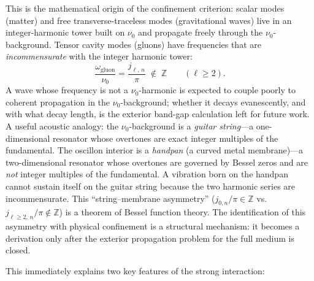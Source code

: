 \documentclass[11pt]{article}
\begin{document}
This is the mathematical origin of the
confinement criterion:
scalar modes (matter) and free transverse-traceless
modes (gravitational waves) live in an
integer-harmonic tower built on $\nu_0$ and
propagate freely through the $\nu_0$-background.
Tensor cavity modes (gluons) have frequencies
that are \emph{incommensurate} with the integer
harmonic tower:
\begin{equation}
  \boxed{
  \frac{\omega_{\mathrm{gluon}}}{\nu_0}
  = \frac{j_{\ell,\,n}}{\pi}
  \;\notin\; \mathbb{Z}
  \qquad (\ell \geq 2).
  }
  \label{eq:confinement_criterion}
\end{equation}
A wave whose frequency is not a $\nu_0$-harmonic
is expected to couple poorly to coherent
propagation in the $\nu_0$-background; whether it
decays evanescently, and with what decay length,
is the exterior band-gap calculation left for
future work.
A useful acoustic analogy: the $\nu_0$-background
is a \emph{guitar string}---a one-dimensional
resonator whose overtones are exact integer
multiples of the fundamental.  The oscillon
interior is a \emph{handpan} (a curved metal
membrane)---a two-dimensional resonator whose
overtones are governed by Bessel zeros and are
\emph{not} integer multiples of the fundamental.
A vibration born on the handpan cannot sustain
itself on the guitar string because the two
harmonic series are incommensurate.  This
``string--membrane asymmetry''
($j_{0,n}/\pi \in \mathbb{Z}$ vs.\
$j_{\ell \geq 2,\,n}/\pi \notin \mathbb{Z}$)
is a theorem of Bessel function theory.  The
identification of this asymmetry with physical
confinement is a structural mechanism: it becomes
a derivation only after the exterior propagation
problem for the full medium is closed.

This immediately explains two key features of
the strong interaction:
\end{document}

